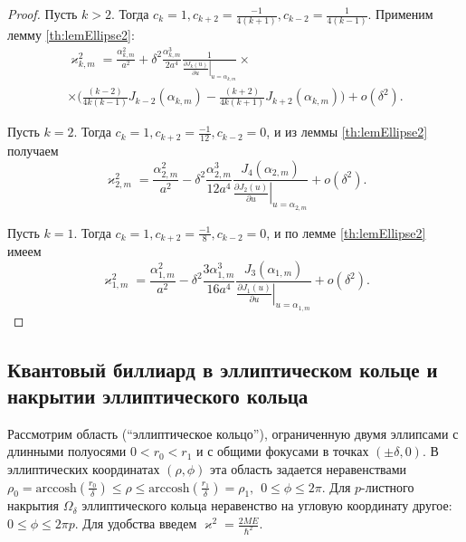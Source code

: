 \begin{proof}
Пусть $k > 2$. Тогда $c_k = 1, c_{k+2}=\frac{-1}{4(k+1)},  c_{k-2}=\frac{1}{4(k-1)}$. Применим лемму \ref{th:lemEllipse2}:
\begin{multline*}
\varkappa_{k, m}^2 = 
\frac{\alpha_{k, m}^2}{a^2} +  \delta^2 \frac{\alpha_{k, m}^3}{2 a^4}\frac{1}{\left.\frac{\partial J_{k} (u)}{\partial u}\right|_{u=\alpha_{k, m}}} \times \\ \times
\biggl(
\frac{(k-2)}{4k(k-1) } J_{k-2}(\alpha_{k, m}) - \frac{(k+2)}{4k(k+1) } J_{k+2}(\alpha_{k, m})
\biggr) + o(\delta^2).
\end{multline*}

Пусть $k =2$. Тогда $c_k = 1, c_{k+2}=\frac{-1}{12},  c_{k-2}=0$, и из леммы \ref{th:lemEllipse2} получаем
$$
\varkappa_{2, m}^2 = 
\frac{\alpha_{2, m}^2}{a^2} -  \delta^2 \frac{\alpha_{2, m}^3}{12 a^4}\frac{J_{4}(\alpha_{2, m})}{\left.\frac{\partial J_{2} (u)}{\partial u}\right|_{u=\alpha_{2, m}}} 
 + o(\delta^2).
$$

Пусть $k =1$. Тогда $c_k = 1, c_{k+2}=\frac{-1}{8},  c_{k-2}=0$, и по лемме \ref{th:lemEllipse2} имеем
$$
\varkappa_{1, m}^2 = 
\frac{\alpha_{1, m}^2}{a^2} -  \delta^2 \frac{3\alpha_{1, m}^3}{16 a^4}\frac{ J_{3}(\alpha_{1, m})}{\left.\frac{\partial J_{1} (u)}{\partial u}\right|_{u=\alpha_{1, m}}}  + o(\delta^2).
$$
\end{proof}



\subsection{Квантовый биллиард в эллиптическом кольце и накрытии эллиптического кольца}\label{sec:ch1/sec4/sub2}

Рассмотрим область (``эллиптическое кольцо''), ограниченную двумя эллипсами с длинными полуосями $0 < r_0 < r_1$ и с общими фокусами в точках $(\pm \delta, 0)$. 
В эллиптических координатах $(\rho, \phi)$ эта область   задается неравенствами $\rho_0 = \text{arccosh} (\frac{r_0}{\delta}) \leq \rho \leq \text{arccosh} (\frac{r_1}{\delta}) = \rho_1, \hspace{5pt} 0 \leq \phi \leq 2 \pi$. 
Для $p$-листного накрытия  $\Omega_\delta$ эллиптического кольца неравенство на угловую координату другое: $0 \leq \phi \leq 2 \pi p$. Для удобства введем $\varkappa^2 = \frac{2 M E}{\hbar^2}$.


